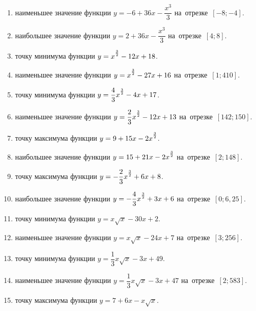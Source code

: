 \documentclass[a4paper,10pt]{article}
\begin{document}
\begin{enumerate}
\item {} наименьшее значение функции $y=-6 +36x-\dfrac{x^3}{3}$ на~отрезке~$\left[-8;-4\right]$.

\item {} наибольшее значение функции $y=2 +36x-\dfrac{x^3}{3}$ на~отрезке~$\left[4;8\right]$.

\item {} точку минимума функции $y=x\strut^{\frac{3}{2}} -12x+18$.

\item {} наименьшее значение функции $y=x\strut^{\frac{3}{2}} -27x+16$ на~отрезке~$\left[1;410\right]$.

\item {} точку минимума функции $y=\dfrac{4}{3}x\strut^{\frac{3}{2}} -4x+17$.

\item {} наименьшее значение функции $y=\dfrac{2}{3}x\strut^{\frac{3}{2}} -12x+13$ на~отрезке~$\left[142;150\right]$.

\item {} точку максимума функции $y=9+15x-2x\strut^{\frac{3}{2}}$.

\item {} наибольшее значение функции $y=15+21x-2x\strut^{\frac{3}{2}}$ на~отрезке~$\left[2;148\right]$.

\item {} точку максимума функции $y=-\dfrac{2}{3}x\strut^{\frac{3}{2}} +6x+8$.

\item {} наибольшее значение функции $y=-\dfrac{4}{3}x\strut^{\frac{3}{2}} +3x+6$ на~отрезке~$\left[0;6,25\right]$.

\item {} точку минимума функции $y=x\sqrt{x} -30x+2$.

\item {} наименьшее значение функции $y=x\sqrt{x} -24x+7$ на~отрезке~$\left[3;256\right]$.

\item {} точку минимума функции $y=\dfrac{1}{3}x\sqrt{x} -3x+49$.

\item {} наименьшее значение функции $y=\dfrac{1}{3}x\sqrt{x} -3x+47$ на~отрезке~$\left[2;583\right]$.

\item {} точку максимума функции $y=7+6x -x\sqrt{x}$.


\end{enumerate}
\end{document}
